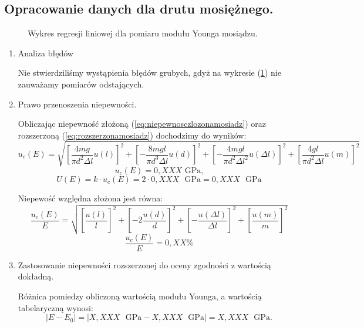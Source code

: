 \documentclass [a4paper,11pt]{article}
\begin{document}
	\subsection{Opracowanie danych dla drutu mosiężnego.}
	
	\begin{figure}[!h]
		\centering
		\caption{Wykres regresji liniowej dla pomiaru modułu Younga mosiądzu.}
		\label{fig:wykmosiadz}
	\end{figure}

	\begin{enumerate}[label=\alph*)]
		\item Analiza błędów
		
		Nie stwierdziliśmy wystąpienia błędów grubych, gdyż na wykresie (\ref{fig:wykmosiadz}) nie zauważamy pomiarów odstających.
		
		\item Prawo przenoszenia niepewności.
		
		Obliczając niepewność złożoną (\ref{eq:niepewnosczlozonamosiadz}) oraz rozszerzoną (\ref{eq:rozszerzonamosiadz}) dochodzimy do wyników: 
		\begin{equation}
		\label{eq:niepewnosczlozonamosiadz}
		u_c(E) = \sqrt{ \left[ \frac{4mg}{\pi d^2\Delta l}u(l) \right]^2 + \left[ -\frac{8mgl}{\pi d^3\Delta l}u(d) \right]^2 + \left[ -\frac{4mgl}{\pi d^2\Delta l^2}u(\Delta l) \right]^2 + \left[ \frac{4gl}{\pi d^2\Delta l}u(m) \right]^2}
		\end{equation}
		$$ u_c(E) = 0,XXX \text{ GPa,} $$
		\begin{equation}
		\label{eq:rozszerzonamosiadz}
		U(E) = k\cdot u_c(E) = 2 \cdot 0,XXX \text{ }\mathrm{GPa} = 0,XXX \text{ }\mathrm{GPa}
		\end{equation}
		
		Niepewość względna złożona jest równa:
		\begin{equation}
		\label{eq:niepewnosczlozonawzglmosiadz}
		\frac{u_c(E)}{E} = \sqrt{ \left[ \frac{u(l)}{l} \right]^2 + \left[ -2\frac{u(d)}{d} \right]^2 + \left[ -\frac{u(\Delta l)}{\Delta l} \right]^2 + \left[ \frac{u(m)}{m} \right]^2}
		\end{equation}
		$$ \frac{u_c(E)}{E} = 0,XX\% $$
		
		\item Zastosowanie niepewności rozszerzonej do oceny zgodności z wartością dokładną.
		
		Różnica pomiedzy obliczoną wartością modułu Younga, a wartością tabelaryczną wynosi:
		\begin{equation}
		\label{eq:roznicamosiadz}
		|E - E_0| = \left|X,XXX \text{ }\mathrm{GPa} - X,XXX \text{ }\mathrm{GPa}\right| = X,XXX \text{ }\mathrm{GPa}.
		\end{equation}
		

\end{enumerate}
\end{document}
